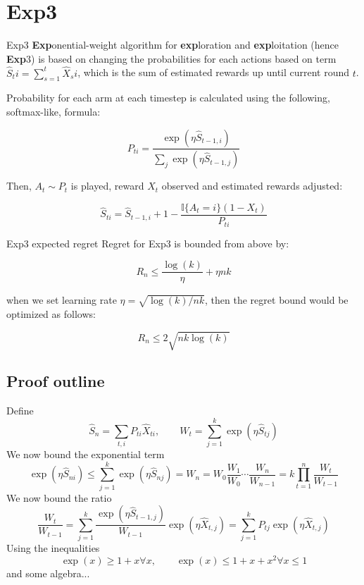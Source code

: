 \documentclass[aspectratio=169,xcolor=dvipsnames]{beamer}
\begin{document}
\section{Exp3}
\begin{frame}{Exp3}
    \textbf{Exp}onential-weight algorithm for \textbf{exp}loration and \textbf{exp}loitation (hence \textbf{Exp}3) is based on changing the probabilities for each actions based on term $\hat{S}_ti = \sum_{s=1}^{t} \hat{X}_si$, which is the sum of estimated rewards up until current round $t$.

    Probability for each arm at each timestep is calculated using the following, softmax-like, formula:

    \begin{equation}
        P_{ti} = \frac{\exp(\eta \hat{S}_{t-1, i})}{\sum_{j} \exp(\eta \hat{S}_{t-1, j})}
    \end{equation}

    Then, $A_t \sim P_t$ is played, reward $X_t$ observed and estimated rewards adjusted:

    \begin{equation}
        \hat{S}_{ti} = \hat{S}_{t-1, i} + 1 - \frac{\mathbb{I}\{ A_t = i \}(1 - X_t)}{P_{ti}}
    \end{equation}
\end{frame}

\begin{frame}{Exp3 expected regret}
    Regret for Exp3 is bounded from above by:

    \begin{equation}
        R_n \leq \frac{\log (k)}{\eta} + \eta nk
    \end{equation}

    when we set learning rate $\eta = \sqrt{\log(k)/nk}$, then the regret bound would be optimized as follows:

    \begin{equation}
        R_n \leq 2 \sqrt{nk \log(k)}
    \end{equation}
\end{frame}

\subsection{Proof outline}
\begin{frame}
  Define
  \[ 
    \hat{S}_n = \sum_{t, i} P_{ti} \hat{X}_{ti},
    \qquad
    W_t = \sum_{j=1}^k \exp\left(\eta \hat{S}_{tj}\right)
  \]
  \pause
  We now bound the exponential term
  \[
    \exp(\eta \hat{S}_{ni}) \leq \sum_{j=1}^k \exp(\eta \hat{S}_{nj} )
    = W_n = W_0 \frac{W_1}{W_0} \cdots \frac{W_n}{W_{n-1}}
    = k \prod_{t=1}^n \frac{W_t}{W_{t-1}}
  \]
  \pause
  We now bound the ratio
  \[
    \frac{W_t}{W_{t-1}}
    = \sum_{j=1}^k \frac{\exp(\eta \hat{S}_{t-1, j} )}{W_{t-1}} \exp(\eta \hat{X}_{t, j})
    = \sum_{j=1}^k P_{tj} \exp(\eta \hat{X}_{t, j})
  \]
  \pause
  Using the inequalities 
  \[
    \exp(x) \geq 1 + x \forall x, \qquad \exp(x) \leq 1 + x + x^2 \forall x \leq 1
  \]
  and some algebra...
\end{frame}
\end{document}
